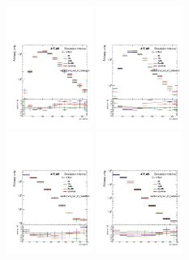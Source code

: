 \begin{figure}[htbp!]
\begin{center}
\includegraphics[width=0.25\textwidth,angle=-90]{figures/boosted/AppendixDijetMC/leadHCand_trk0_Pt_Sidebandlessbin_log.pdf}
\includegraphics[width=0.25\textwidth,angle=-90]{figures/boosted/AppendixDijetMC/leadHCand_trk0_Pt_Sidebanddata_log.pdf}\\
\includegraphics[width=0.25\textwidth,angle=-90]{figures/boosted/AppendixDijetMC/leadHCand_trk1_Pt_Sidebandlessbin_log.pdf}
\includegraphics[width=0.25\textwidth,angle=-90]{figures/boosted/AppendixDijetMC/leadHCand_trk1_Pt_Sidebanddata_log.pdf}\\

\end{center}
\end{figure}
